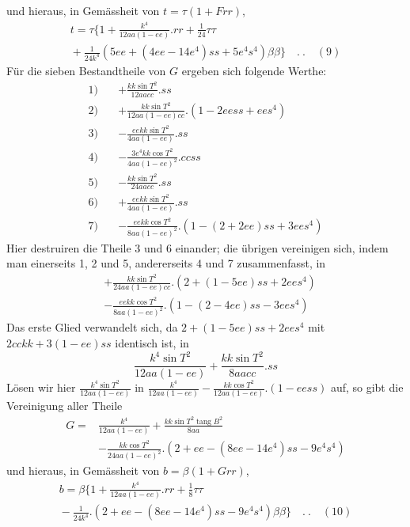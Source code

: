 %
und hieraus, in Gemässheit von \(t=\tau(1+Frr)\),
\[
\begin{aligned}
t=\tau\{1+\frac{k^4}{12aa(1-ee)}\mathord{.}rr+\tfrac1{24}\tau\tau\\
{}+\frac1{24k^4}(5ee+(4ee-14e^4)ss+5e^4s^4)\beta\beta\}\quad .\ .\quad(9)
\end{aligned}
\]
Für die sieben Bestandtheile von \(G\) ergeben sich folgende Werthe:
\[
\begin{aligned}
1)\quad&+\frac{kk\sin T^2}{12aacc}\mathord{.}ss\\
2)\quad&+\frac{kk\sin T^2}{12aa(1-ee)cc}\mathord{.}(1-2eess+ees^4)\\
3)\quad&-\frac{eekk\sin T^2}{4aa(1-ee)}\mathord{.}ss\\
4)\quad&-\frac{3e^4kk\cos T^2}{4aa(1-ee)^2}\mathord{.}ccss\\
5)\quad&-\frac{kk\sin T^2}{24aacc}\mathord{.}ss\\
6)\quad&+\frac{eekk\sin T^2}{4aa(1-ee)}\mathord{.}ss\\
7)\quad&-\frac{eekk\cos T^2}{8aa(1-ee)^2}\mathord{.}(1-(2+2ee)ss+3ees^4)
\end{aligned}
\]
Hier destruiren die Theile 3 und 6 einander; die übrigen vereinigen sich, indem man einerseits 1, 2 und 5, andererseits 4 und 7 zusammenfasst, in
\[
\begin{aligned}
&+\frac{kk\sin T^2}{24aa(1-ee)cc}\mathord{.}(2+(1-5ee)ss+2ees^4)\\
&-\frac{eekk\cos T^2}{8aa(1-ee)^2}\mathord{.}(1-(2-4ee)ss-3ees^4)
\end{aligned}
\]
Das erste Glied verwandelt sich, da \(2+(1-5ee)ss+2ees^4\) mit \(2cckk+3(1-ee)ss\) identisch ist, in
\[
\frac{k^4\sin T^2}{12aa(1-ee)}+\frac{kk\sin T^2}{8aacc}\mathord{.}ss
\]
Lösen wir hier \(\frac{k^4\sin T^2}{12aa(1-ee)}\) in \(\frac{k^4}{12aa(1-ee)}-\frac{kk\cos T^2}{12aa(1-ee)}\mathord{.}(1-eess)\) auf, so gibt die Vereinigung aller Theile
\[
\begin{aligned}
G={}&\frac{k^4}{12aa(1-ee)}+\frac{kk\sin T^2\operatorname{tang}B^2}{8aa}\\
&-\frac{kk\cos T^2}{24aa(1-ee)^2}\mathord{.}(2+ee-(8ee-14e^4)ss-9e^4s^4)
\end{aligned}
\]
und hieraus, in Gemässheit von \(b=\beta(1+Grr)\),
\[
\begin{aligned}
b=\beta\{1+\frac{k^4}{12aa(1-ee)}\mathord{.}rr+\tfrac18\tau\tau\\
{}-\frac1{24k^4}\mathord{.}(2+ee-(8ee-14e^4)ss-9e^4s^4)\beta\beta\}\quad .\ .\quad(10)
\end{aligned}
\]

